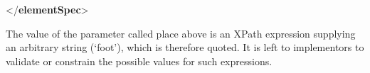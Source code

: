 \begin{shaded}
\hspace*{1em}\mbox{}\newline 
\hspace*{1em}\mbox{}\newline 
\hspace*{1em}\hspace*{1em}\mbox{}\newline 
\hspace*{1em}\mbox{}\newline 
{}\mbox{}\newline 
{</\textbf{elementSpec}>}\end{shaded}\egroup\par \par
The value of the parameter called \textsf{place} above is an XPath expression supplying an arbitrary string (‘foot’), which is therefore quoted. It is left to implementors to validate or constrain the possible values for such expressions.
